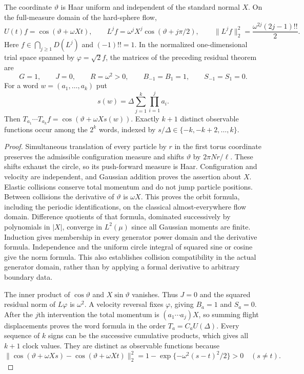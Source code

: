 \begin{theorem}
\label{thm:v16-collective}
The coordinate $\vartheta$ is Haar uniform and independent of the
standard normal $X$. On the full-measure domain of the hard-sphere flow,
\begin{equation}\label{eq:v16-collective-orbit}
 U(t)f=\cos(\vartheta+\omega Xt),\qquad
 L^j f=\omega^jX^j\cos(\vartheta+j\pi/2),\qquad
 \|L^jf\|_2^2=\frac{\omega^{2j}(2j-1)!!}{2}.
\end{equation}
Here $f\in\bigcap_{j\ge1}D(L^j)$ and $(-1)!!=1$. In the normalized
one-dimensional trial space spanned by $\varphi=\sqrt2f$, the matrices
of the preceding residual theorem are
\[
 G=1,\qquad J=0,\qquad R=\omega^2>0,\qquad
 B_{-1}=B_1=1,\qquad S_{-1}=S_1=0.
\]
For a word $w=(a_1,\ldots,a_k)$ put
\[
 s(w)=\Delta\sum_{j=1}^k\prod_{i=1}^j a_i.
\]
Then $T_{a_1}\cdots T_{a_k}f=\cos(\vartheta+\omega Xs(w))$.
Exactly $k+1$ distinct observable functions occur among the $2^k$
words, indexed by $s/\Delta\in\{-k,-k+2,\ldots,k\}$.
\end{theorem}
\begin{proof}
Simultaneous translation of every particle by $r$ in the first torus
coordinate preserves the admissible configuration measure and shifts
$\vartheta$ by $2\pi Nr/\ell$. These shifts exhaust the circle, so its
push-forward measure is Haar. Configuration and velocity are independent,
and Gaussian addition proves the assertion about $X$.
Elastic collisions conserve total momentum and do not jump particle
positions. Between collisions the derivative of $\vartheta$ is
$\omega X$. This proves the orbit formula, including the periodic
identifications, on the classical almost-everywhere flow domain.
Difference quotients of that formula, dominated successively by
polynomials in $|X|$, converge in $L^2(\mu)$ since all Gaussian moments
are finite. Induction gives membership in every generator power domain
and the derivative formula. Independence and the uniform circle integral
of squared sine or cosine give the norm formula. This also establishes
collision compatibility in the actual generator domain, rather than
by applying a formal derivative to arbitrary boundary data.

The inner product of $\cos\vartheta$ and $X\sin\vartheta$ vanishes.
Thus $J=0$ and the squared residual norm of $L\varphi$ is $\omega^2$.
A velocity reversal fixes $\varphi$, giving $B_a=1$ and $S_a=0$.
After the $j$th intervention the total momentum is
$(a_1\cdots a_j)X$, so summing flight displacements proves the word
formula in the order $T_a=C_aU(\Delta)$. Every sequence of $k$ signs
can be the successive cumulative products, which gives all $k+1$
clock values. They are distinct as observable functions because
\[
 \|\cos(\vartheta+\omega Xs)-\cos(\vartheta+\omega Xt)\|_2^2
       =1-\exp\{-\omega^2(s-t)^2/2\}>0\quad(s\ne t).
\]
\end{proof}

